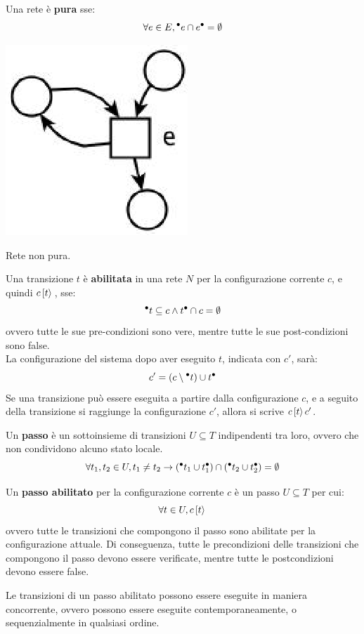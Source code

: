 \begin{defn}
    Una rete è \textbf{pura} sse:
    \[
        \forall e \in E, {^\bullet}e \cap e^\bullet = \emptyset
    \]
    \begin{marginfigure}[-1cm]
        \includegraphics[width=0.4\linewidth]{img/rete_non_pura.png}
        \caption{Rete non pura.}
        \label{fig:rete_non_pura}
    \end{marginfigure}
\end{defn}

\begin{defn}
    Una transizione $t$ è \textbf{abilitata} in una rete $N$ per la
    configurazione corrente $c$, e quindi $c\,[t\rangle\,$, sse:
    \[
        {^\bullet}t \subseteq c \land t^\bullet \cap c = \emptyset
    \]
    ovvero tutte le sue pre-condizioni sono vere, mentre tutte le sue
    post-condizioni sono false.\\
    La configurazione del sistema dopo aver eseguito $t$, indicata con $c'$,
    sarà:
    \[
        c' = \left(c \setminus {^\bullet}t\right) \cup t^\bullet
    \]
    Se una transizione può essere eseguita a partire dalla configurazione $c$,
    e a seguito della transizione si raggiunge la configurazione $c'$, allora
    si scrive $c\,[t\rangle\,c'$.
\end{defn}

\begin{defn}
    Un \textbf{passo} è un sottoinsieme di transizioni $U \subseteq T$
    indipendenti tra loro, ovvero che non condividono alcuno stato locale.
    \[
        \forall t_1, t_2 \in U, t_1 \neq t_2 \rightarrow
        ({^\bullet}t_1 \cup t_1^\bullet) \cap
        ({^\bullet}t_2 \cup t_2^\bullet) = \emptyset
    \]
\end{defn}

\begin{defn}
    Un \textbf{passo abilitato} per la configurazione corrente $c$ è un passo
    $U \subseteq T$ per cui:
    \[
        \forall t \in U, c\,[t\rangle\,
    \]
    ovvero tutte le transizioni che compongono il passo sono abilitate
    per la configurazione attuale.
    Di conseguenza, tutte le precondizioni delle transizioni che compongono
    il passo devono essere verificate, mentre tutte le postcondizioni devono
    essere false.

    Le transizioni di un passo abilitato possono essere eseguite in maniera
    concorrente, ovvero possono essere eseguite contemporaneamente,
    o sequenzialmente in qualsiasi ordine.
\end{defn}

